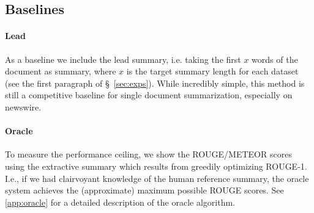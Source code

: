 {\color{red}
\subsection{Baselines}
\paragraph{Lead} As a baseline we include the lead summary, i.e. taking the first 
$x$ words of the document as summary, where $x$ is the target summary length for each dataset (see the 
first paragraph of \S~\ref{sec:exps}). While incredibly simple, this method is still a 
competitive baseline for single document summarization, especially on newswire.
\paragraph{Oracle} To measure the performance ceiling,
we show the ROUGE/METEOR scores using the 
extractive summary which results from greedily optimizing ROUGE-1. I.e., if we 
had clairvoyant knowledge
of the human reference summary, the oracle system achieves the (approximate) 
maximum possible ROUGE scores. 
See \autoref{app:oracle} for a detailed
description of the oracle algorithm.
}











